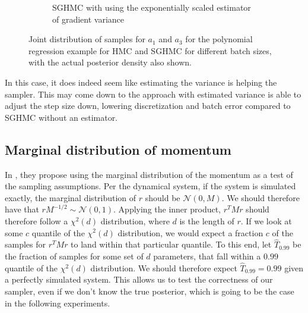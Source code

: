 \begin{figure}[htbp]
\begin{subfigure}[t]{0.4\textwidth}
        \caption{SGHMC with using the exponentially scaled estimator of gradient variance}
    \end{subfigure}
    \caption{Joint distribution of samples for $a_1$ and $a_3$ for the polynomial regression example for HMC and SGHMC for different batch sizes, with the actual posterior density also shown.}
    \label{fig:simualted_var_est_joint_comp}
\end{figure}
In this case, it does indeed seem like estimating the variance is helping the sampler.
This may come down to the approach with estimated variance is able to adjust the step size down, lowering discretization and batch error compared to SGHMC without an estimator. 

\subsection{Marginal distribution of momentum}

In \cite{wenzel_how_2020}, they propose using the marginal distribution of the momentum as a test of the sampling assumptions. 
Per the dynamical system, if the system is simulated exactly, the marginal distribution of $r$ should be $\mathcal{N}(0, M)$. 
We should therefore have that $r M^{-1/2} \sim \mathcal{N}(0, 1)$. 
Applying the inner product, $r^T M r$ should therefore follow a $\chi^2(d)$ distribution, where $d$ is the length of $r$. 
If we look at some $c$ quantile of the $\chi^2(d)$ distribution, we would expect a fraction $c$ of the samples for $r^T M r$ to land within that particular quantile. 
To this end, let $\hat T_{0.99}$ be the fraction of samples for some set of $d$ parameters, that fall within a $0.99$ quantile of the $\chi^2(d)$ distribution. 
We should therefore expect $\hat T_{0.99}=0.99$ given a perfectly simulated system.
This allows us to test the correctness of our sampler, even if we don't know the true posterior, which is going to be the case in the following experiments.

